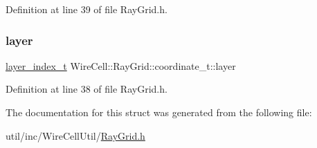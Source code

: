 Definition at line 39 of file Ray\+Grid.\+h.

\mbox{\label{struct_wire_cell_1_1_ray_grid_1_1coordinate__t_a909a1153eda352840725de39381fd1d8}} 
\subsubsection{\texorpdfstring{layer}{layer}}
{\footnotesize\ttfamily \hyperlink{namespace_wire_cell_1_1_ray_grid_ab7562e54b58eede813d5b70b5eb85812}{layer\+\_\+index\+\_\+t} Wire\+Cell\+::\+Ray\+Grid\+::coordinate\+\_\+t\+::layer}



Definition at line 38 of file Ray\+Grid.\+h.



The documentation for this struct was generated from the following file\+:\begin{DoxyCompactItemize}
\item 
util/inc/\+Wire\+Cell\+Util/\hyperlink{_ray_grid_8h}{Ray\+Grid.\+h}\end{DoxyCompactItemize}
